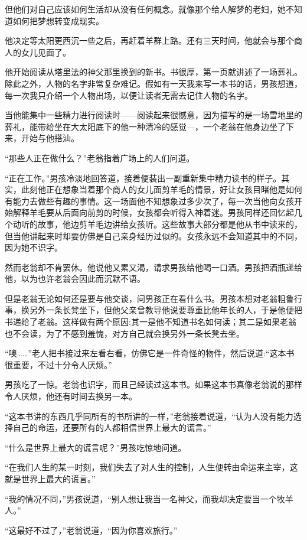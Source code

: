\documentclass[twoside,openany]{book}
\begin{document}
但他们对自己应该如何生活却从没有任何概念。就像那个给人解梦的老妇，她不知道如何把梦想转变成现实。

他决定等太阳更西沉一些之后，再赶着羊群上路。还有三天时间，他就会与那个商人的女儿见面了。

他开始阅读从塔里法的神父那里换到的新书。书很厚，第一页就讲述了一场葬礼。除此之外，人物的名字非常复杂难记。假如有一天我来写一本书的话，男孩想道，每一次我只介绍一个人物出场，以便让读者无需去记住人物的名字。

当他能集中一些精力进行阅读时——阅读起来很憾意，因为描写的是一场雪地里的葬礼，能带给坐在大太阳底下的他一种清冷的感觉---，一个老翁在他身边坐了下来，开始与他搭汕。

“那些人正在做什么？”老翁指着广场上的人们问道。

“正在工作。”男孩冷淡地回答道，接着便装出一副重新集中精力读书的样子。其实，此刻他正在想象当着那个商人的女儿面剪羊毛的情景，好让女孩目睹他是如何有能力去做些有趣的事情。这一场面他不知想象过多少次了，每一次当他向女孩开始解释羊毛要从后面向前剪的时候，女孩都会听得入神着迷。男孩同样还回忆起几个动听的故事，他边剪羊毛边讲给女孩听。这些故事大部分都是他从书中读来的，但当他讲起来时却要仿佛是自己亲身经历过似的。女孩永远不会知道其中的不同，因为她不识字。

然而老翁却不肯罢休。他说他又累又渴，请求男孩给他喝一口酒。男孩把酒瓶递给他，以为也许老翁会因此而沉默不语。

但是老翁无论如何还是要与他交谈，问男孩正在看什么书。男孩本想对老翁粗鲁行事，换另外一条长凳坐下，但他父亲曾教导他说要尊重比他年长的人，于是他便把书递给了老翁。这样做有两个原因:其一是他不知道书名如何读；其二是如果老翁也不会读，为了不感到羞愧，对方自己就会换另外一条长凳去坐。

“噢……”老人把书接过来左看右看，仿佛它是一件奇怪的物件，然后说道:“这本书很重要，不过十分令人厌烦。”

男孩吃了一惊。老翁也识字，而且己经读过这本书。如果这本书真像老翁说的那样令人厌烦，他还有时间去换另一本。

“这本书讲的东西几乎同所有的书所讲的一样，”老翁接着说道，“认为人没有能力选择自己的命运，还要所有的人都相信世界上最大的谎言。”

“什么是世界上最大的谎言呢？”男孩吃惊地问道。

“在我们人生的某一时刻，我们失去了对人生的控制，人生便转由命运来主宰，这就是世界上最大的谎言。”

“我的情况不同，”男孩说道，“别人想让我当一名神父，而我却决定要当一个牧羊人。”

“这最好不过了，”老翁说道，“因为你喜欢旅行。”
\end{document}
